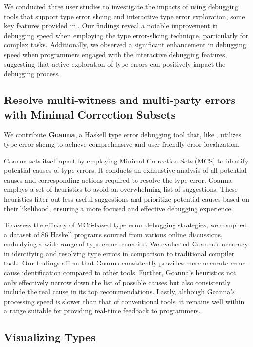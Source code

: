 We conducted three user studies to investigate the impacts of using debugging tools that support type error slicing and interactive type error exploration, some key features provided in \chameleon{}. Our findings reveal a notable improvement in debugging speed when employing the type error-slicing technique, particularly for complex tasks. Additionally, we observed a significant enhancement in debugging speed when programmers engaged with the interactive debugging features, suggesting that active exploration of type errors can positively impact the debugging process.

\subsection{Resolve multi-witness and multi-party errors with Minimal Correction Subsets}

We contribute \textbf{Goanna}, a Haskell type error debugging tool that, like \chameleon{}, utilizes type error slicing to achieve comprehensive and user-friendly error localization.

Goanna sets itself apart by employing Minimal Correction Sets (MCS) to identify potential causes of type errors. It conducts an exhaustive analysis of all potential causes and corresponding actions required to resolve the type error. Goanna employs a set of heuristics to avoid an overwhelming list of suggestions. These heuristics filter out less useful suggestions and prioritize potential causes based on their likelihood, ensuring a more focused and effective debugging experience.


To assess the efficacy of MCS-based type error debugging strategies, we compiled a dataset of 86 Haskell programs sourced from various online discussions, embodying a wide range of type error scenarios. We evaluated Goanna's accuracy in identifying and resolving type errors in comparison to traditional compiler tools. Our findings affirm that Goanna consistently provides more accurate error-cause identification compared to other tools. Further, Goanna's heuristics not only effectively narrow down the list of possible causes but also consistently include the real cause in its top recommendations. Lastly, although Goanna's processing speed is slower than that of conventional tools, it remains well within a range suitable for providing real-time feedback to programmers. 

\subsection{Visualizing Types}

